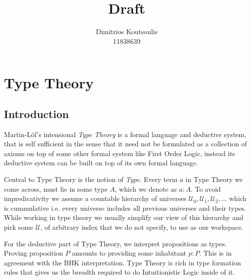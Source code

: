 \documentclass[12pt]{report}
\begin{document}
 
\title{Draft}%
\author{Dimitrios Koutsoulis\\ %
11838639} %
 
\begin{titlepage}
\hypersetup{pageanchor=false}
\maketitle
\thispagestyle{empty}
\end{titlepage}
\hypersetup{pageanchor=true}
\chapter{Type Theory}
\section{Introduction}
Martin-Löf's intensional \textit{Type Theory} is a formal language and deductive system, that is self sufficient in the sense that it need not be formulated as a collection of axioms on top of some other formal system like First Order Logic, instead its deductive system can be built on top of its own formal language. 

Central to Type Theory is the notion of \textit{Type}. Every term $a$ in Type Theory we come across, must lie in some type $A$, which we denote as $a : A$. 
To avoid impredicativity we assume a countable hierarchy of universes $\mathcal{U}_0,\mathcal{U}_1,\mathcal{U}_2,\ldots$ which is cummulative i.e. every universe includes all previous universes and their types. 
While working in type theory we usually simplify our view of this hierarchy and pick some $\mathcal{U}$, of arbitrary index that we do not specify, to use as our workspace. 

For the deductive part of Type Theory, we interpret propositions as types. 
Proving proposition $P$ amounts to providing some inhabitant $p : P$. 
This is in agreement with the BHK interpretation. 
Type Theory is rich in type formation rules that gives us the breadth required to do Intuitionistic Logic inside of it. 
\end{document}
